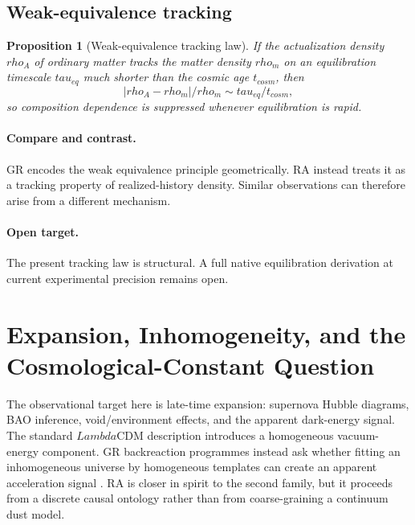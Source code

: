 \documentclass[11pt]{article}
\def\Lambda{Lambda}%
\def\rho{rho}%
\def\tau{tau}%
\def\mathrm#1{#1}%
\def\frac#1#2{#1/#2}%
\newtheorem{proposition}{Proposition}
\begin{document}
\subsection{Weak-equivalence tracking}

\begin{proposition}[Weak-equivalence tracking law]
If the actualization density $\rho_A$ of ordinary matter tracks the matter density $\rho_m$ on an equilibration timescale $\tau_{\mathrm{eq}}$ much shorter than the cosmic age $t_{\mathrm{cosm}}$, then
\[
\frac{|\rho_A-\rho_m|}{\rho_m}\sim \frac{\tau_{\mathrm{eq}}}{t_{\mathrm{cosm}}},
\]
so composition dependence is suppressed whenever equilibration is rapid.
\end{proposition}

\paragraph{Compare and contrast.} GR encodes the weak equivalence principle geometrically. RA instead treats it as a tracking property of realized-history density. Similar observations can therefore arise from a different mechanism.

\paragraph{Open target.} The present tracking law is structural. A full native equilibration derivation at current experimental precision remains open.

\section{Expansion, Inhomogeneity, and the Cosmological-Constant Question}
\label{sec:expansion}

The observational target here is late-time expansion: supernova Hubble diagrams, BAO inference, void/environment effects, and the apparent dark-energy signal. The standard $\Lambda$CDM description introduces a homogeneous vacuum-energy component. GR backreaction programmes instead ask whether fitting an inhomogeneous universe by homogeneous templates can create an apparent acceleration signal \cite{Buchert2000,Wiltshire2007,Rasanen2004}. RA is closer in spirit to the second family, but it proceeds from a discrete causal ontology rather than from coarse-graining a continuum dust model.
\end{document}
